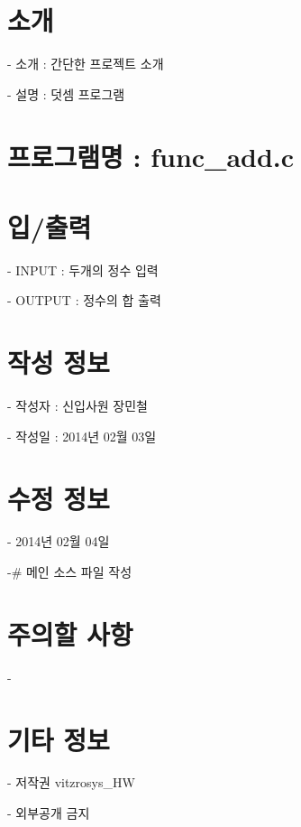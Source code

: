 \hypertarget{index_intro}{}\section{소개}\label{index_intro}
\begin{DoxyVerb}- 소개 : 간단한 프로젝트 소개 

- 설명 : 덧셈 프로그램
\end{DoxyVerb}
\hypertarget{index_Program}{}\section{프로그램명 \-: func\-\_\-add.\-c}\label{index_Program}
\hypertarget{index_InOut}{}\section{입/출력}\label{index_InOut}
\begin{DoxyVerb}- INPUT : 두개의 정수 입력

- OUTPUT : 정수의 합 출력
\end{DoxyVerb}
\hypertarget{index_CreateInfo}{}\section{작성 정보}\label{index_CreateInfo}
\begin{DoxyVerb}- 작성자 :   신입사원 장민철

- 작성일 :   2014년 02월 03일
\end{DoxyVerb}
\hypertarget{index_ModifyInfo}{}\section{수정 정보}\label{index_ModifyInfo}
\begin{DoxyVerb}- 2014년 02월 04일

    -# 메인 소스 파일 작성
\end{DoxyVerb}
\hypertarget{index_Caution}{}\section{주의할 사항}\label{index_Caution}
\begin{DoxyVerb}- 
\end{DoxyVerb}
\hypertarget{index_common}{}\section{기타 정보}\label{index_common}
\begin{DoxyVerb}- 저작권    vitzrosys_HW

- 외부공개 금지\end{DoxyVerb}
 